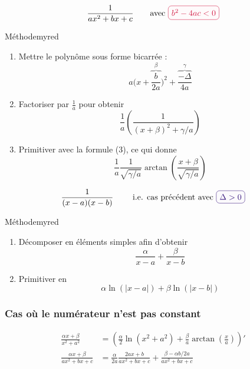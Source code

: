     \begin{equation}
        \frac{1}{ax^2 + bx + c} \qquad \text{avec } \lilbox{myred}{$b^2 -4ac < 0$}
    \end{equation}
        
    \begin{omed}{Méthode}{myred}
        \begin{enumerate}[label=(\alph*)]
            \item Mettre le polynôme sous forme bicarrée : 
            \[ a \bigg( x+\overbrace{\frac{b}{2a}}^{\beta} \bigg)^2 + \overbrace{\frac{- \Delta}{4a}}^{\gamma} \]
            \item Factoriser par $\frac{1}{a}$ pour obtenir 
            \[ \frac{1}{a} \left( \frac{1}{(x+ \beta)^2 + \gamma / a} \right) \]
            \item Primitiver avec la formule (3), ce qui donne 
            \[ \frac{1}{a} \frac{1}{\sqrt{\gamma / a}} \arctan \left( \frac{x + \beta}{\sqrt{\gamma / a}} \right) \]
        \end{enumerate}
    \end{omed}

    \begin{equation}
        \frac{1}{(x-a)(x-b)} \qquad \text{ i.e. cas précédent avec } \lilbox{mypurple}{$\Delta > 0$}
    \end{equation}

    \begin{omed}{Méthode}{myred}
        \begin{enumerate}[label=(\alph*)]
            \item Décomposer en éléments simples afin d’obtenir \[ \frac{\alpha}{x-a} + \frac{\beta}{x-b} \]
            \item Primitiver en \[ \alpha \ln \left(|x-a|\right) + \beta \ln \left(|x-b|\right)\]
        \end{enumerate}
    \end{omed}

    \subsubsection{Cas où le numérateur n’est pas constant}

    \begin{align}
        \frac{\alpha x + \beta}{ x^2 + a^2} &= \left( \frac{\alpha}{2} \ln (x^2 + a^2) + \frac{\beta}{a} \arctan \left( \frac{x}{a} \right) \right)' \\
        \frac{\alpha x + \beta}{ax^2 + bx + c} &= \frac{\alpha}{2a} \frac{2ax + b}{ax^2 + bx + c} + \frac{\beta - \alpha b / 2a}{ax^2 + bx + c} 
    \end{align}

